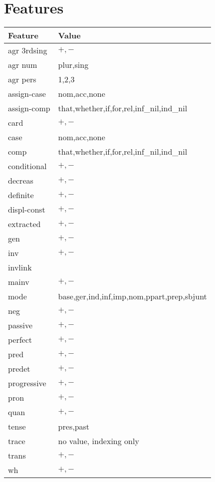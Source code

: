 \section{Features}

\begin{tabular}{|l|l|}
\hline
Feature&Value\\
\hline
\hline
agr 3rdsing&$+,-$\\
agr num&plur,sing\\
agr pers&1,2,3\\
assign-case&nom,acc,none\\
assign-comp&that,whether,if,for,rel,inf\_nil,ind\_nil\\
card&$+,-$\\
case&nom,acc,none\\
comp&that,whether,if,for,rel,inf\_nil,ind\_nil\\
conditional&$+,-$\\
decreas&$+,-$\\
definite&$+,-$\\
displ-const&$+,-$\\
extracted&$+,-$\\
gen&$+,-$\\
inv&$+,-$\\
invlink&\\
mainv&$+,-$\\
mode&base,ger,ind,inf,imp,nom,ppart,prep,sbjunt\\
neg&$+,-$\\
passive&$+,-$\\
perfect&$+,-$\\
pred&$+,-$\\
predet&$+,-$\\
progressive&$+,-$\\
pron&$+,-$\\
quan&$+,-$\\
tense&pres,past\\
trace&no value, indexing only\\
trans&$+,-$\\
wh&$+,-$\\
\hline
\end{tabular}
